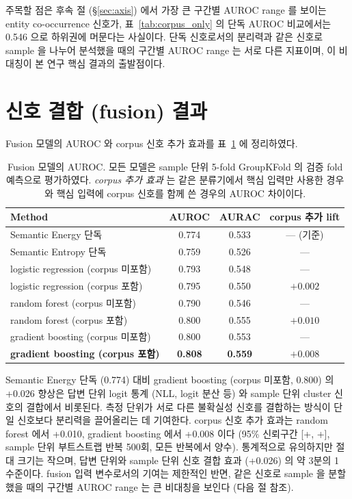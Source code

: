 \documentclass[oneside,ko,under]{snuthesis}
\begin{document}
주목할 점은 후속 절 (§\ref{sec:axis}) 에서 가장 큰 구간별 AUROC range 를 보이는 entity co-occurrence 신호가, 표~\ref{tab:corpus_only} 의 단독 AUROC 비교에서는 0.546 으로 하위권에 머문다는 사실이다. 단독 신호로서의 분리력과 같은 신호로 sample 을 나누어 분석했을 때의 구간별 AUROC range 는 서로 다른 지표이며, 이 비대칭이 본 연구 핵심 결과의 출발점이다.


\section{신호 결합 (fusion) 결과}\label{sec:fusion_results}

Fusion 모델의 AUROC 와 corpus 신호 추가 효과를 표~\ref{tab:fusion} 에 정리하였다.

\begin{table}[htbp]
\centering
\small
\caption[Fusion 모델 AUROC 와 corpus 추가 효과]{Fusion 모델의 AUROC. 모든 모델은 sample 단위 5-fold GroupKFold 의 검증 fold 예측으로 평가하였다. \emph{corpus 추가 효과} 는 같은 분류기에서 핵심 입력만 사용한 경우와 핵심 입력에 corpus 신호를 함께 쓴 경우의 AUROC 차이이다.}
\label{tab:fusion}
\begin{tabular}{@{}lccc@{}}
\toprule
Method & AUROC & AURAC & corpus 추가 lift \\
\midrule
Semantic Energy 단독                  & 0.774 & 0.533 & — (기준) \\
Semantic Entropy 단독                 & 0.759 & 0.526 & — \\
logistic regression (corpus 미포함)   & 0.793 & 0.548 & — \\
logistic regression (corpus 포함)     & 0.795 & 0.550 & $+0.002$ \\
random forest (corpus 미포함)         & 0.790 & 0.546 & — \\
random forest (corpus 포함)           & 0.800 & 0.555 & $+0.010$ \\
gradient boosting (corpus 미포함)     & 0.800 & 0.553 & — \\
\textbf{gradient boosting (corpus 포함)} & \textbf{0.808} & \textbf{0.559} & $+0.008$ \\
\bottomrule
\end{tabular}
\end{table}

Semantic Energy 단독 (0.774) 대비 gradient boosting (corpus 미포함, 0.800) 의 +0.026 향상은 답변 단위 logit 통계 (NLL, logit 분산 등) 와 sample 단위 cluster 신호의 결합에서 비롯된다. 측정 단위가 서로 다른 불확실성 신호를 결합하는 방식이 단일 신호보다 분리력을 끌어올리는 데 기여한다. corpus 신호 추가 효과는 random forest 에서 +0.010, gradient boosting 에서 +0.008 이다 (95\% 신뢰구간 [+\HeadlineFusionLiftCIlow{}, +\HeadlineFusionLiftCIhigh{}], sample 단위 부트스트랩 반복 500회, 모든 반복에서 양수). 통계적으로 유의하지만 절대 크기는 작으며, 답변 단위와 sample 단위 신호 결합 효과 (+0.026) 의 약 3분의 1 수준이다. fusion 입력 변수로서의 기여는 제한적인 반면, 같은 신호로 sample 을 분할했을 때의 구간별 AUROC range 는 큰 비대칭을 보인다 (다음 절 참조).
\end{document}
